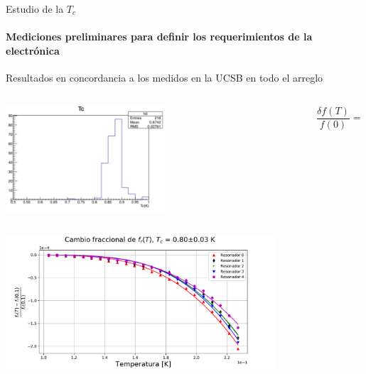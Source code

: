 \documentclass[ignorenonframetext,12pt]{beamer}
\begin{document}
\begin{frame}{Estudio de la $T_c$}
				\framesubtitle{Mediciones preliminares para definir los requerimientos
				de la electrónica}
				Resultados en concordancia a los medidos en la UCSB en todo el arreglo
				\begin{columns}
								\begin{column}{0.69\textwidth}
				\centering
												\includegraphics[width=0.54\textwidth]{medicion_Tc_ucsb}
								\end{column}
				\begin{column}{0.39\textwidth}
												{\color{blue}\begin{equation*}
								\frac{\delta f(T)}{f(0)} = 
																-\frac{\alpha}{2}\sqrt{\frac{\pi \Delta}{2 k_B
																T}} e^{-\frac{\Delta}{k_B T}}
												\end{equation*}}
								\end{column}
								\end{columns}
												\includegraphics[width=0.75\textwidth]{delta_f_vs_temp}
\end{frame}
\end{document}
